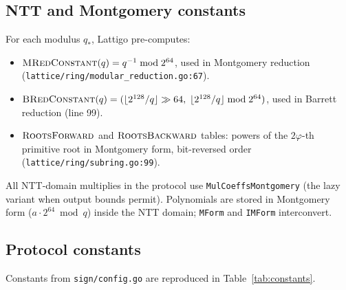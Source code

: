 \subsection{NTT and Montgomery constants}

For each modulus $q_*$, Lattigo \cite{lattigov7} pre-computes:

\begin{itemize}
  \item $\textsc{MRedConstant}(q) = q^{-1} \bmod 2^{64}$, used in Montgomery reduction (\texttt{lattice/ring/modular\_reduction.go:67}).
  \item $\textsc{BRedConstant}(q) = (\lfloor 2^{128}/q \rfloor \gg 64,\;\lfloor 2^{128}/q \rfloor \bmod 2^{64})$, used in Barrett reduction (line 99).
  \item $\textsc{RootsForward}$ and $\textsc{RootsBackward}$ tables: powers of the $2\varphi$-th primitive root in Montgomery form, bit-reversed order (\texttt{lattice/ring/subring.go:99}).
\end{itemize}

All NTT-domain multiplies in the protocol use \texttt{MulCoeffsMontgomery} (the lazy variant when output bounds permit). Polynomials are stored in Montgomery form ($a \cdot 2^{64} \bmod q$) inside the NTT domain; \texttt{MForm} and \texttt{IMForm} interconvert.

\subsection{Protocol constants}

Constants from \texttt{sign/config.go} are reproduced in Table~\ref{tab:constants}.

